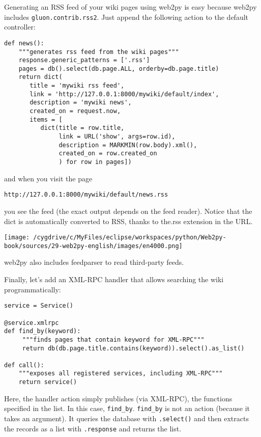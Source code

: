 \documentclass[justified,sixbynine,notoc]{tufte-book}
\def\ft{\small\tt}
\def\inxx#1{\index{#1}}
\begin{document}
\begin{fullwidth}
\inxx{rss}
Generating an RSS feed of your wiki pages using web2py is easy because web2py includes {\ft gluon.contrib.rss2}. Just append the following action to the default controller:
\begin{lstlisting}
def news():
    """generates rss feed from the wiki pages"""
    response.generic_patterns = ['.rss']
    pages = db().select(db.page.ALL, orderby=db.page.title)
    return dict(
       title = 'mywiki rss feed',
       link = 'http://127.0.0.1:8000/mywiki/default/index',
       description = 'mywiki news',
       created_on = request.now,
       items = [
          dict(title = row.title,
               link = URL('show', args=row.id),
               description = MARKMIN(row.body).xml(),
               created_on = row.created_on
               ) for row in pages])
\end{lstlisting}
\noindent and when you visit the page
\begin{lstlisting}[keywords={}]
http://127.0.0.1:8000/mywiki/default/news.rss
\end{lstlisting}
\noindent you see the feed (the exact output depends on the feed reader). Notice that the dict is automatically converted to RSS, thanks to the.rss extension in the URL.


\goodbreak\begin{center}\texttt{[image: /cygdrive/c/MyFiles/eclipse/workspaces/python/Web2py-book/sources/29-web2py-english/images/en4000.png]}\end{center}

\noindent web2py also includes feedparser to read third-party feeds.

\inxx{XMLRPC}
Finally, let's add an XML-RPC handler that allows searching the wiki programmatically:
\begin{lstlisting}
service = Service()

@service.xmlrpc
def find_by(keyword):
     """finds pages that contain keyword for XML-RPC"""
     return db(db.page.title.contains(keyword)).select().as_list()

def call():
    """exposes all registered services, including XML-RPC"""
    return service()
\end{lstlisting}

Here, the handler action simply publishes (via XML-RPC), the functions specified in the list. In this case, {\ft find\_by}. {\ft find\_by} is not an action (because it takes an argument). It queries the database with {\ft .select()} and then extracts the records as a list with {\ft .response} and returns the list.


\end{fullwidth}
\end{document}
